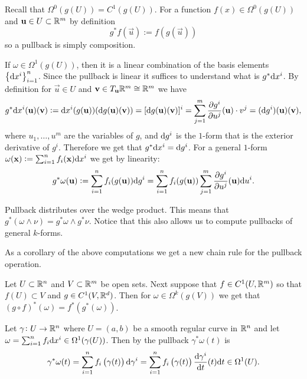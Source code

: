 \documentclass[11pt,a4paper]{article}
\begin{document}
\begin{example}
  Recall that $\Omega^0(g(U)) = C^1(g(U))$.
  For a function $f(x) \in \Omega^0(g(U))$ and $\boldsymbol{\mathbf{u}} \in U \subset \mathbb{R}^m$
  by definition
  \[
    g^*f(\vec u) :=
    f(g(\vec u))
  \]
  so a pullback is simply composition.
\end{example}
\begin{example}
  \label{exmp:pullback-one-form}
  If $\omega \in \Omega^1(g(U))$, then it is a linear combination
  of the basis elements $\set{\dx^i}_{i=1}^{n}$.
  Since the pullback is linear it suffices to understand
  what is $g^*\dx^i$.
  By definition for $\vec u \in U$ and $\boldsymbol{\mathbf{v}} \in T_{\boldsymbol{\mathbf{u}}} \mathbb{R}^m \cong \mathbb{R}^m$
  we have
  \[
    g^*\dx^i(\vec u)(\vec v) :=
    \dx^i(g(\vec u))
    (\dif g(\vec u)(\vec v)) =
    [\dif g(\vec u)(\vec v)]^i =
    \sum_{j=1}^{m} \frac{\partial g^i}{\partial u^j}(\vec u) \cdot v^j =
    (\dif g^i)(\vec u)(\vec v),
  \]
  where $u_1,\dots,u^m$ are the variables of $g$,
  and $\mathrm{d} g^i$ is the $1$-form that is
  the exterior derivative of $g^i$.
  Therefore we get that $g^*\dx^i = \dif g^i$.
  For a general $1$-form
  $\omega(\vec x) := \sum_{i=1}^{n} f_i(\vec x) \dx^i$ we get by linearity:
  \[
    g^*\omega(\boldsymbol{\mathbf{u}}) :=
    \sum_{i=1}^{n} f_i(g(\boldsymbol{\mathbf{u}})) \mathrm{d} g^i =
    \sum_{i=1}^{n} f_i(g(\boldsymbol{\mathbf{u}})) \sum_{j=1}^{m} 
    \frac{\partial g^i}{\partial u^j}(\boldsymbol{\mathbf{u}}) \mathrm{d} u^i.
  \]
\end{example}

\begin{remark}
  Pullback distributes over the wedge product.
  This means that $g^*(\omega \wedge \nu) = g^*\omega \wedge g^* \nu$.
  Notice that this also allows us to compute pullbacks of
  general $k$-forms.
\end{remark}

\begin{remark}
  As a corollary of the above computations we get a new chain rule
  for the pullback operation.
\end{remark}

\begin{corollary}
  Let $U \subset \mathbb{R}^n$ and $V \subset \mathbb{R}^m$ be open sets.
  Next suppose that $f \in C^1(U,\mathbb{R}^m)$ so that $f(U) \subset V$
  and $g \in C^1(V,\mathbb{R}^d)$.
  Then for $\omega \in \Omega^k(g(V))$ we get that
  $(g \circ f)^*(\omega) = f^*(g^*(\omega))$.
\end{corollary}

\begin{example}
  \label{exmp:pullback-of-curve}
  Let $\gamma \colon U \to \mathbb{R}^n$ where $U = (a,b)$ be a
  smooth regular curve in $\mathbb{R}^n$ and let
  $\omega = \sum_{i=1}^{n} f_i \dx^i \in \Omega^1(\gamma(U))$.
  Then by  the pullback $\gamma^* \omega(t)$ is
  \[
    \gamma^* \omega(t) =
    \sum_{i=1}^{n} f_i\del{\gamma(t)} \dif \gamma^i =
    \sum_{i=1}^{n} f_i\del{\gamma(t)} \frac{\dif \gamma^i}{\dt}(t) \dt \in
    \Omega^1(U).
  \]
\end{example}
\end{document}

